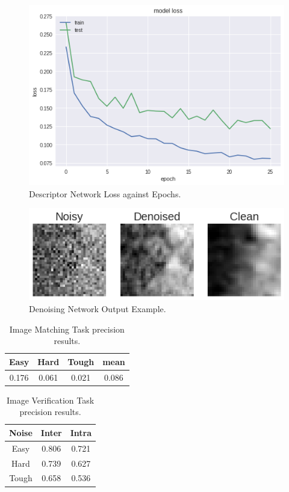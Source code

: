 \documentclass[10pt,twocolumn,letterpaper]{article}
\begin{document}
\begin{figure}[H]
\centering
  \includegraphics[width=0.65\linewidth]{figures/descriptor_train.png}
  \caption{Descriptor Network Loss against Epochs.}
  \label{fig:descriptor_loss}
\end{figure}

\begin{figure}[H]
\centering
  \includegraphics[width=0.65\linewidth]{report/figures/denoise_image.png}
  \caption{Denoising Network Output Example.}
  \label{fig:denoise_image}
\end{figure}


\begin{table}[h]
\centering
\begin{tabular}{| c | c | c | c |}
\hline
Easy     & Hard      & Tough     & mean      \\
\hline
0.176 & 0.061 & 0.021 & 0.086 \\
\hline
\end{tabular}
\caption{Image Matching Task precision results.}
\label{tab:baseline_match}
\end{table}

\begin{table}[h]
\centering
\begin{tabular}{| c | c | c |}
\hline
Noise & Inter    & Intra    \\
\hline
Easy  & 0.806 & 0.721 \\
Hard  & 0.739 & 0.627 \\
Tough & 0.658 & 0.536 \\
\hline
\end{tabular}
\caption{Image Verification Task precision results.}
\label{tab:baseline_verification}
\end{table}
\end{document}
